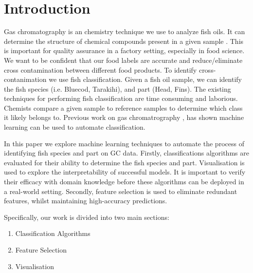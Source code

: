 \documentclass[runningheads]{llncs}
\begin{document}
\section{Introduction}


Gas chromatography \cite{eder1995gas} is an chemistry technique we use to analyze fish oils. 
It can determine the structure of chemical compounds present in a given sample \cite{restek2018high}. 
This is important for quality assurance in a factory setting, especially in food science. 
We want to be confident that our food labels are accurate and reduce/eliminate cross contamination between different food products. 
To identify cross-contanimation we use fish classification. 
Given a fish oil sample, we can identify the fish species (i.e. Bluecod, Tarakihi), and part (Head, Fins).
The existing techniques for performing fish classification are time consuming and laborious. 
Chemists compare a given sample to reference samples to determine which class it likely belongs to. 
Previous work on gas chromatrography \cite{bi2020gc,matyushin2020gas}, has shown machine learning can be used to automate classification. 

In this paper we explore machine learning techniques to automate the process of identifying fish species and part on GC data. 
Firstly, classifications algorithms are evaluated for their ability to determine the fish species and part. 
Visualisation is used to explore the interpretability of successful models.
It is important to verify their efficacy with domain knowledge before these algorithms can be deployed in a real-world setting.
Secondly, feature selection is used to eliminate redundant features, whilst maintaining high-accuracy predictions. 

Specifically, our work is divided into two main sections: 
\begin{enumerate}
    \item Classification Algorithms 
    \item Feature Selection
    \item Visualisation 
\end{enumerate}
\end{document}
